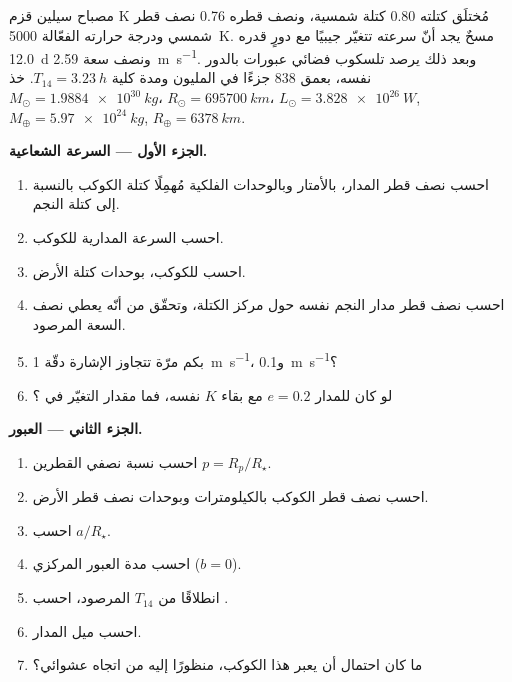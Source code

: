 \begin{problem}
\label{pb:b3:exoplanets:1}
مصباح سيلين قزم K مُختلَق كتلته 0.80 كتلة شمسية، ونصف قطره
0.76 نصف قطر شمسي ودرجة حرارته الفعّالة \qty{5000}{K}. مسحٌ
 يجد أنّ سرعته تتغيّر جيبيًا مع
دورٍ قدره \qty{12.0}{d} ونصف سعة \qty{2.59}{m.s^{-1}}. وبعد
ذلك يرصد تلسكوب فضائي عبورات بالدور نفسه، بعمق
\num{838} جزءًا في المليون ومدة كلية $T_{14} = \qty{3.23}{h}$.
خذ $M_\odot = \qty{1.9884e30}{kg}$، $R_\odot = \qty{695700}{km}$،
$L_\odot = \qty{3.828e26}{W}$, $M_\oplus = \qty{5.97e24}{kg}$,
$R_\oplus = \qty{6378}{km}$.

\medskip\noindent\textbf{الجزء الأول --- السرعة الشعاعية.}
\begin{enumerate}
\item احسب نصف قطر المدار، بالأمتار وبالوحدات الفلكية
  مُهمِلًا كتلة الكوكب بالنسبة إلى كتلة النجم.
\item احسب السرعة المدارية للكوكب.
\item احسب  للكوكب، بوحدات كتلة الأرض.
\item احسب نصف قطر مدار النجم نفسه حول مركز
  الكتلة، وتحقّق من أنّه يعطي نصف السعة المرصود.
\item بكم مرّة تتجاوز الإشارة دقّة
  \qty{1}{m.s^{-1}}، و\qty{0.1}{m.s^{-1}}؟
\item لو كان للمدار $e = 0.2$ مع بقاء $K$ نفسه، فما مقدار
  التغيّر في ؟
\end{enumerate}

\medskip\noindent\textbf{الجزء الثاني --- العبور.}
\begin{enumerate}[resume]
\item احسب نسبة نصفي القطرين $p = R_p/R_\star$.
\item احسب نصف قطر الكوكب بالكيلومترات وبوحدات نصف قطر الأرض.
\item احسب $a/R_\star$.
\item احسب مدة العبور المركزي ($b = 0$).
\item انطلاقًا من $T_{14}$ المرصود، احسب .
\item احسب ميل المدار.
\item ما كان احتمال أن يعبر هذا الكوكب، منظورًا إليه من
  اتجاه عشوائي؟
\end{enumerate}


\end{problem}
